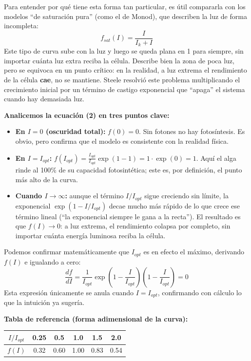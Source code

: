 \documentclass[11pt,a4paper]{article}
\begin{document}
Para entender por qué tiene esta forma tan particular, es útil compararla con los modelos ``de saturación pura'' (como el de Monod), que describen la luz de forma incompleta:
\begin{equation}
f_{sat}(I) = \frac{I}{I_k + I}
\end{equation}
Este tipo de curva sube con la luz y luego se queda plana en 1 para siempre, sin importar cuánta luz extra reciba la célula. Describe bien la zona de poca luz, pero se equivoca en un punto crítico: en la realidad, a luz extrema el rendimiento de la célula \textbf{cae}, no se mantiene. Steele resolvió este problema multiplicando el crecimiento inicial por un término de castigo exponencial que ``apaga'' el sistema cuando hay demasiada luz.

\textbf{Analicemos la ecuación (2) en tres puntos clave:}
\begin{itemize}
    \item \textbf{En $I=0$ (oscuridad total):} $f(0)=0$. Sin fotones no hay fotosíntesis. Es obvio, pero confirma que el modelo es consistente con la realidad física.
    \item \textbf{En $I=I_{opt}$:} $f(I_{opt}) = \frac{I_{opt}}{I_{opt}}\exp(1-1) = 1 \cdot \exp(0) = 1$. Aquí el alga rinde al 100\% de su capacidad fotosintética; este es, por definición, el punto más alto de la curva.
    \item \textbf{Cuando $I \to \infty$:} aunque el término $I/I_{opt}$ sigue creciendo sin límite, la exponencial $\exp(1-I/I_{opt})$ decae mucho más rápido de lo que crece ese término lineal (``la exponencial siempre le gana a la recta''). El resultado es que $f(I) \to 0$: a luz extrema, el rendimiento colapsa por completo, sin importar cuánta energía luminosa reciba la célula.
\end{itemize}

Podemos confirmar matemáticamente que $I_{opt}$ es en efecto el máximo, derivando $f(I)$ e igualando a cero:
\begin{equation}
\frac{df}{dI} = \frac{1}{I_{opt}}\exp\left(1-\frac{I}{I_{opt}}\right)\left(1-\frac{I}{I_{opt}}\right) = 0
\end{equation}
Esta expresión únicamente se anula cuando $I=I_{opt}$, confirmando con cálculo lo que la intuición ya sugería.

\textbf{Tabla de referencia (forma adimensional de la curva):}
\begin{center}
\begin{tabular}{cccccc}
\toprule
$I/I_{opt}$ & 0.25 & 0.5 & 1.0 & 1.5 & 2.0 \\
\midrule
$f(I)$ & 0.32 & 0.60 & 1.00 & 0.83 & 0.54 \\
\bottomrule
\end{tabular}
\end{center}
\end{document}
